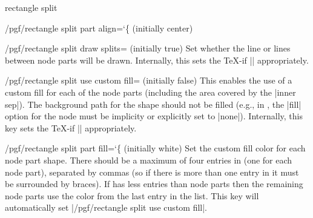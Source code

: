 \begin{shape}{rectangle split}
\begin{key}{/pgf/rectangle split part align={\ttfamily\char`\{} (initially center)}
\begin{codeexample}[]
\def\v#1{\vrule width#1ex height2ex}
\def\x{\v2 \nodepart{second} \v5 \nodepart{third} \v2 \nodepart{fourth} \v2}
\end{codeexample}
  \end{key}
   
  \begin{key}{/pgf/rectangle split draw splits= (initially true)}
  	Set whether the line or lines between node parts will be drawn.
  	Internally, this sets the \TeX-if |\ifpgfrectanglesplitdrawsplits| 
  	appropriately.
  \end{key}
  
  \begin{key}{/pgf/rectangle split use custom fill= (initially false)}
    This enables the use of a custom fill for each of the node
    parts (including the area covered by the |inner sep|). The 
    background path for the shape should not be filled (e.g., in
    \tikzname{}, the |fill|
    option for the node must be implicity or explicitly set to |none|).
    Internally, this key sets the \TeX-if 
    |\ifpgfrectanglesplitusecustomfill| appropriately.
  \end{key}
  
  \begin{key}{/pgf/rectangle split part fill={\ttfamily\char`\{} (initially white)}
  	Set the custom fill color for each node part shape. 
  	There should be a maximum of four entries in  (one 
  	for each node part), separated by commas (so if there is more than 
  	one entry in  it must be surrounded by braces).
  	If   has less entries than node
    parts then the remaining node parts use the color from
    the last entry in the list. This key will automatically set
    |/pgf/rectangle split use custom fill|.
    
\begin{codeexample}[]
\end{codeexample}


\end{key}
\end{shape}

